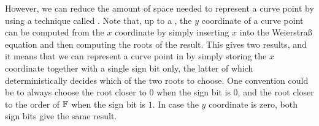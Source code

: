 However, we can reduce the amount of space needed to represent a curve point by using a technique called . Note that, up to a , the $y$ coordinate of a curve point can be computed from the $x$ coordinate by simply inserting $x$ into the Weierstraß equation and then computing the roots of the result. This gives two results, and it means that we can represent a curve point in  by simply storing the $x$ coordinate together with a single sign bit only, the latter of which deterministically decides which of the two roots to choose. One convention could be to always choose the root closer to $0$ when the sign bit is $0$, and the root closer to the order of $\mathbb{F}$ when the sign bit is $1$. In case the $y$ coordinate is zero, both sign bits give the same result.




